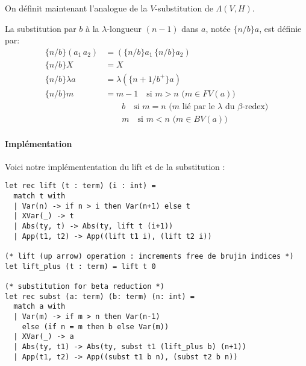 On définit maintenant l’analogue de la $V$-substitution de $\Lambda(V,H)$.

\begin{defn}
La substitution par $b$ à la $\lambda$-longueur $(n-1)$ dans $a$, notée $\{n/b\}a$, est définie par:
\begin{align*}
\{n/b\}(a_1 \, a_2) &= (\{n/b\} a_1 \, \{n/b\} a_2) \\
\{n/b\} X &= X \\
\{n/b\} \lambda a &= \lambda (\{n+1/b^{+}\} a) \\
\{n/b\} m &= m-1 \quad \text{si $m > n$ ($m \in FV(a)$)} \\
&\quad \quad b \quad \text{si $m=n$ ($m$ lié par le $\lambda$ du $\beta$-redex)} \\
&\quad \quad m \quad \text{si $m < n$ ($m \in BV(a)$)}
\end{align*}
\end{defn}



\paragraph{Implémentation}

Voici notre implémententation du lift et de la substitution :
\begin{lstlisting}
let rec lift (t : term) (i : int) =
  match t with
  | Var(n) -> if n > i then Var(n+1) else t
  | XVar(_) -> t
  | Abs(ty, t) -> Abs(ty, lift t (i+1))
  | App(t1, t2) -> App((lift t1 i), (lift t2 i))

(* lift (up arrow) operation : increments free de brujin indices *)
let lift_plus (t : term) = lift t 0

(* substitution for beta reduction *)
let rec subst (a: term) (b: term) (n: int) =
  match a with
  | Var(m) -> if m > n then Var(n-1)
    else (if n = m then b else Var(m))
  | XVar(_) -> a
  | Abs(ty, t1) -> Abs(ty, subst t1 (lift_plus b) (n+1))
  | App(t1, t2) -> App((subst t1 b n), (subst t2 b n))
\end{lstlisting}

